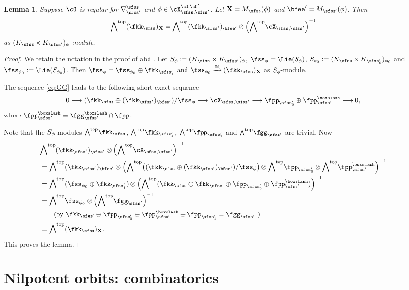 \documentclass[12pt,a4paper]{amsart}
\newcommand{\X}{\mathbf{X}}
\numberwithin{equation}{section}
\newtheorem{lem}[thm]{Lemma}
\theoremstyle{remark}
\begin{document}
\begin{lem}\label{lem:tan}
  Suppose $\cO$ is regular for $\DDss$ and $\ww\in \CXOO$. Let $\X = \Ms(\ww)$ and
  $\Xp=\Msp(\ww)$.
  Then
  \begin{equation}\label{eq:aod}
    \wedgetop (\fkks)_{\X}  = \wedgetop (\fkksp)_{\Xp} \otimes \left(\wedgetop \CXss\right)^{{-1}}
  \end{equation}
  as $(\Ks\times \Ksp)_{\ww}$-module.
\end{lem}
\begin{proof}
  We retain the notation in the proof of  abd .
  Let $S_{\ww} := (\Ks\times \Ksp)_{\ww}$, $\fss_{\ww} = \Lie(S_{\ww})$,
   $S_{\wwo} := (\Ks\times \Kspo)_{\wwo}$ and $\fss_{\wwo} := \Lie(S_{\wwo})$.
  Then $\fss_{\ww} = \fss_{\wwo}\oplus \fkkspt$ and
  $\fss_{\wwo}\xrightarrow{\cong} (\fkks)_{\X}$ as $S_{\phi}$-module.

  The sequence \eqref{eq:GG} leads to the following short exact sequence
  \[
    0\longrightarrow (\fkks\oplus (\fkksp)_{\Xp})/ \fss_{\ww}
    \longrightarrow \CXss \longrightarrow \fpppso \oplus \fpppsb \longrightarrow 0,
  \]
  where $\fpppsb = \fggpsb\cap \fpp$.

  Note that the $S_{\phi}$-modules $\wedgetop \fkks$, $\wedgetop \fkkspt$,
$\wedgetop \fpppst$ and $\wedgetop \fggsp$ are trivial.
  Now
  \[
    \begin{split}
      & \wedgetop (\fkksp)_{\Xp} \otimes \left(\wedgetop \CXss\right)^{{-1}}\\
      & = \wedgetop (\fkksp)_{\Xp} \otimes
      \left(\wedgetop  \big((\fkks\oplus (\fkksp)_{\Xp})/\fss_{\ww}\big)
        \otimes \wedgetop \fpppso \otimes \wedgetop\fpppsb\right)^{-1}\\
      & =  \wedgetop (\fss_{\wwo} \oplus \fkkspt) \otimes
      \left(\wedgetop (\fkks \oplus \fkksp\oplus \fpppso \oplus \fpppsb )\right)^{{-1}} \\
      & = \wedgetop \fss_{\wwo} \otimes \left(\wedgetop \fggsp  \right)^{-1}\\
      & \qquad \text{(by $\fkksp \oplus \fpppso \oplus \fpppsb \oplus \fpppst = \fggsp $ )}\\
      & = \wedgetop (\fkks)_{\X}.
    \end{split}
  \]
 This proves the lemma.
\end{proof}

\section{Nilpotent orbits: combinatorics}
\end{document}
